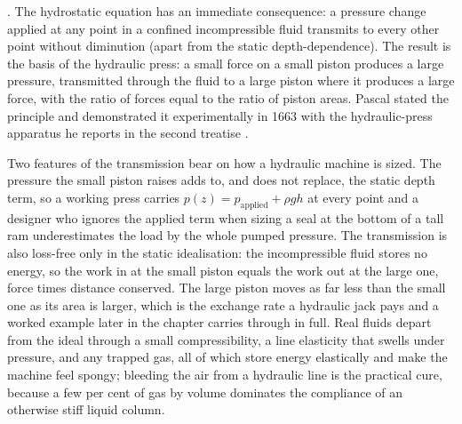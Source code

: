 . The hydrostatic equation has an
immediate consequence: a pressure change applied at any point in
a confined incompressible fluid transmits to every other point
without diminution (apart from the static depth-dependence). The
result is the basis of the hydraulic press: a small force on a
small piston produces a large pressure, transmitted through the
fluid to a large piston where it produces a large force, with the
ratio of forces equal to the ratio of piston areas. Pascal stated
the principle and demonstrated it experimentally in 1663 with the
hydraulic-press apparatus he reports in the second treatise
\cite[Treatise II]{hist:pascal1663}.

Two features of the transmission bear on how a hydraulic machine is
sized. The pressure the small piston raises adds to, and does not replace,
the static depth term, so a working press carries $p(z)=p_{\text{applied}}
+\rho g h$ at every point and a designer who ignores the applied term when
sizing a seal at the bottom of a tall ram underestimates the load by the
whole pumped pressure. The transmission is also loss-free only in the
static idealisation: the incompressible fluid stores no energy, so the
work in at the small piston equals the work out at the large one, force
times distance conserved. The large piston moves as far less than the
small one as its area is larger, which is the exchange rate a hydraulic
jack pays and a worked example later in the chapter carries through in
full. Real fluids depart from the ideal through a small compressibility, a
line elasticity that swells under pressure, and any trapped gas, all of
which store energy elastically and make the machine feel spongy; bleeding
the air from a hydraulic line is the practical cure, because a few per
cent of gas by volume dominates the compliance of an otherwise stiff
liquid column.

